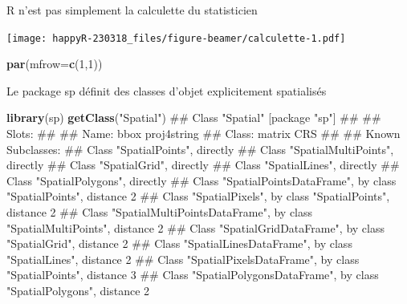 \documentclass[8pt,ignorenonframetext,]{beamer}
\newenvironment{Shaded}{\begin{snugshade}}{\end{snugshade}}
\newcommand{\KeywordTok}[1]{\textcolor[rgb]{0.13,0.29,0.53}{\textbf{{#1}}}}
\newcommand{\DataTypeTok}[1]{\textcolor[rgb]{0.13,0.29,0.53}{{#1}}}
\newcommand{\DecValTok}[1]{\textcolor[rgb]{0.00,0.00,0.81}{{#1}}}
\newcommand{\StringTok}[1]{\textcolor[rgb]{0.31,0.60,0.02}{{#1}}}
\newcommand{\OtherTok}[1]{\textcolor[rgb]{0.56,0.35,0.01}{{#1}}}
\newcommand{\NormalTok}[1]{{#1}}
\begin{document}
\begin{frame}[fragile]{R n'est pas simplement la calculette du
statisticien}

\begin{Shaded}
\end{Shaded}

\texttt{[image: happyR-230318\_files/figure-beamer/calculette-1.pdf]}

\begin{Shaded}
\begin{Highlighting}[]
\KeywordTok{par}\NormalTok{(}\DataTypeTok{mfrow=}\KeywordTok{c}\NormalTok{(}\DecValTok{1}\NormalTok{,}\DecValTok{1}\NormalTok{))}
\end{Highlighting}
\end{Shaded}

\end{frame}

\begin{frame}[fragile]{Le package sp définit des classes d'objet
explicitement spatialisés}

\begin{Shaded}
\begin{Highlighting}[]
\KeywordTok{library}\NormalTok{(sp)}
\KeywordTok{getClass}\NormalTok{(}\StringTok{"Spatial"}\NormalTok{)}
\NormalTok{## Class "Spatial" [package "sp"]}
\NormalTok{## }
\NormalTok{## Slots:}
\NormalTok{##                               }
\NormalTok{## Name:         bbox proj4string}
\NormalTok{## Class:      matrix         CRS}
\NormalTok{## }
\NormalTok{## Known Subclasses: }
\NormalTok{## Class "SpatialPoints", directly}
\NormalTok{## Class "SpatialMultiPoints", directly}
\NormalTok{## Class "SpatialGrid", directly}
\NormalTok{## Class "SpatialLines", directly}
\NormalTok{## Class "SpatialPolygons", directly}
\NormalTok{## Class "SpatialPointsDataFrame", by class "SpatialPoints", distance 2}
\NormalTok{## Class "SpatialPixels", by class "SpatialPoints", distance 2}
\NormalTok{## Class "SpatialMultiPointsDataFrame", by class "SpatialMultiPoints", distance 2}
\NormalTok{## Class "SpatialGridDataFrame", by class "SpatialGrid", distance 2}
\NormalTok{## Class "SpatialLinesDataFrame", by class "SpatialLines", distance 2}
\NormalTok{## Class "SpatialPixelsDataFrame", by class "SpatialPoints", distance 3}
\NormalTok{## Class "SpatialPolygonsDataFrame", by class "SpatialPolygons", distance 2}
\end{Highlighting}
\end{Shaded}

\end{frame}
\end{document}
